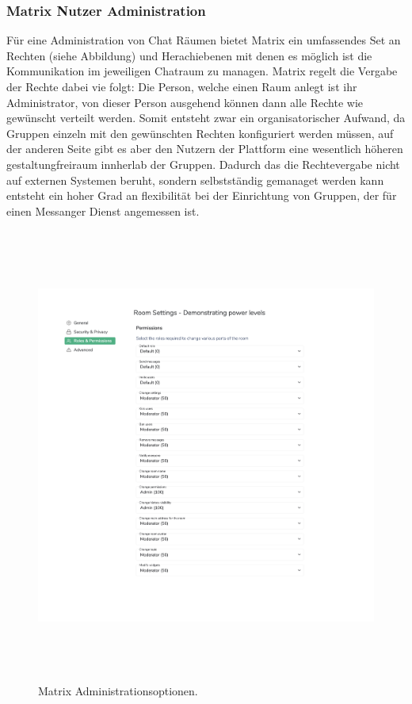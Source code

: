 \subsubsection{Matrix Nutzer Administration}\label{chapter:vdmf}
Für eine Administration von Chat Räumen bietet Matrix ein umfassendes Set an Rechten (siehe Abbildung) und Herachiebenen mit denen es möglich ist die Kommunikation im jeweiligen Chatraum zu managen. Matrix regelt die Vergabe der Rechte dabei vie folgt: Die Person, welche einen Raum anlegt ist ihr Administrator, von dieser Person ausgehend können dann alle Rechte wie gewünscht verteilt werden. Somit entsteht zwar ein organisatorischer Aufwand, da Gruppen einzeln mit den gewünschten Rechten konfiguriert werden müssen, auf der anderen Seite gibt es aber den Nutzern der Plattform eine wesentlich höheren gestaltungfreiraum innherlab der Gruppen. Dadurch das die Rechtevergabe nicht auf externen Systemen beruht, sondern selbstständig gemanaget werden kann entsteht ein hoher Grad an flexibilität bei der Einrichtung von Gruppen, der für einen Messanger Dienst angemessen ist.

\begin{figure}[htb]
    \centering
    \includegraphics[height=15cm]{graphics/moderation3.png}
    \caption[Matrix Administrationsoptionen]{Matrix Administrationsoptionen.\footnotemark}
    \label{abb:UI}
\end{figure}

